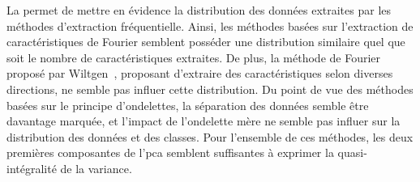 La  permet de mettre en évidence la distribution des données extraites par les méthodes d'extraction fréquentielle. Ainsi, les méthodes basées sur l'extraction de caractéristiques de Fourier semblent posséder une distribution similaire quel que soit le nombre de caractéristiques extraites. De plus, la méthode de Fourier proposé par Wiltgen~\cite{Wiltgen2008}, proposant d'extraire des caractéristiques selon diverses directions, ne semble pas influer cette distribution. Du point de vue des méthodes basées sur le principe d'ondelettes, la séparation des données semble être davantage marquée, et l'impact de l'ondelette mère ne semble pas influer sur la distribution des données et des classes. Pour l'ensemble de ces méthodes, les deux premières composantes de l'\gls{pca} semblent suffisantes à exprimer la quasi-intégralité de la variance.\par

